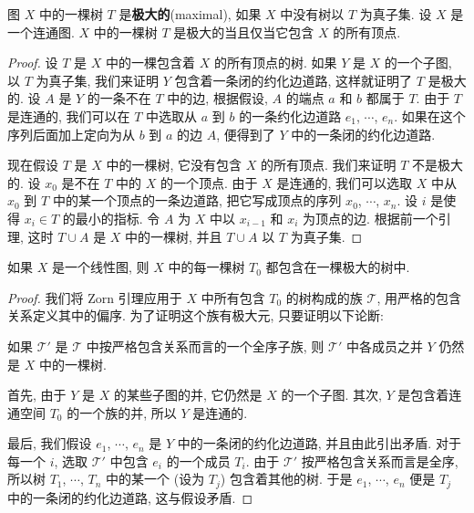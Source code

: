 \begin{theorem}[极大树的刻画]
\label{theorem:ch14-maximal-tree}
图 $X$ 中的一棵树 $T$ 是\textbf{极大的}(maximal), 如果 $X$ 中没有树以 $T$ 为真子集. 设 $X$ 是一个连通图. $X$ 中的一棵树 $T$ 是极大的当且仅当它包含 $X$ 的所有顶点.
\end{theorem}

\begin{proof}
设 $T$ 是 $X$ 中的一棵包含着 $X$ 的所有顶点的树. 如果 $Y$ 是 $X$ 的一个子图, 以 $T$ 为真子集, 我们来证明 $Y$ 包含着一条闭的约化边道路, 这样就证明了 $T$ 是极大的. 设 $A$ 是 $Y$ 的一条不在 $T$ 中的边, 根据假设, $A$ 的端点 $a$ 和 $b$ 都属于 $T$. 由于 $T$ 是连通的, 我们可以在 $T$ 中选取从 $a$ 到 $b$ 的一条约化边道路 $e_{1}$, $\cdots$, $e_{n}$. 如果在这个序列后面加上定向为从 $b$ 到 $a$ 的边 $A$, 便得到了 $Y$ 中的一条闭的约化边道路.

现在假设 $T$ 是 $X$ 中的一棵树, 它没有包含 $X$ 的所有顶点. 我们来证明 $T$ 不是极大的. 设 $x_{0}$ 是不在 $T$ 中的 $X$ 的一个顶点. 由于 $X$ 是连通的, 我们可以选取 $X$ 中从 $x_{0}$ 到 $T$ 中的某一个顶点的一条边道路, 把它写成顶点的序列 $x_{0}$, $\cdots$, $x_{n}$. 设 $i$ 是使得 $x_{i}\in T$ 的最小的指标. 令 $A$ 为 $X$ 中以 $x_{i-1}$ 和 $x_{i}$ 为顶点的边. 根据前一个引理, 这时 $T\cup A$ 是 $X$ 中的一棵树, 并且 $T\cup A$ 以 $T$ 为真子集.
\end{proof}

\begin{theorem}[极大树的存在性]
\label{theorem:ch14-maximal-tree-existence}
如果 $X$ 是一个线性图, 则 $X$ 中的每一棵树 $T_{0}$ 都包含在一棵极大的树中.
\end{theorem}

\begin{proof}
我们将 Zorn 引理应用于 $X$ 中所有包含 $T_{0}$ 的树构成的族 $\mathcal{T}$, 用严格的包含关系定义其中的偏序. 为了证明这个族有极大元, 只要证明以下论断:

如果 $\mathcal{T}'$ 是 $\mathcal{T}$ 中按严格包含关系而言的一个全序子族, 则 $\mathcal{T}'$ 中各成员之并 $Y$ 仍然是 $X$ 中的一棵树.

首先, 由于 $Y$ 是 $X$ 的某些子图的并, 它仍然是 $X$ 的一个子图. 其次, $Y$ 是包含着连通空间 $T_{0}$ 的一个族的并, 所以 $Y$ 是连通的.

最后, 我们假设 $e_{1}$, $\cdots$, $e_{n}$ 是 $Y$ 中的一条闭的约化边道路, 并且由此引出矛盾. 对于每一个 $i$, 选取 $\mathcal{T}'$ 中包含 $e_{i}$ 的一个成员 $T_{i}$. 由于 $\mathcal{T}'$ 按严格包含关系而言是全序, 所以树 $T_{1}$, $\cdots$, $T_{n}$ 中的某一个 (设为 $T_{j}$) 包含着其他的树. 于是 $e_{1}$, $\cdots$, $e_{n}$ 便是 $T_{j}$ 中的一条闭的约化边道路, 这与假设矛盾.
\end{proof}

